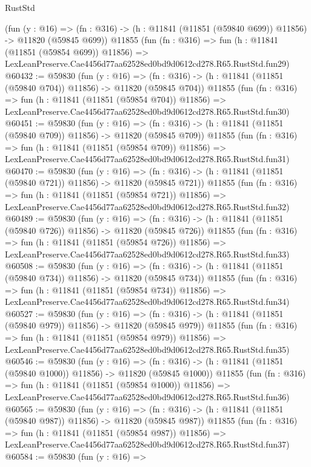 \begin{lexlean}{RustStd}
\begin{coremodule}
    (fun (y : @16) =>
    (fn : @316) -> (h : @11841 (@11851 (@59840 @699)) @11856) -> @11820 (@59845 @699))
    @11855
    (fun (fn : @316) =>
    fun (h : @11841 (@11851 (@59854 @699)) @11856) =>
    LexLeanPreserve.Cae4456d77aa62528ed0bd9d0612cd278.R65.RustStd.fun29)
@60432 := @59830
    (fun (y : @16) =>
    (fn : @316) -> (h : @11841 (@11851 (@59840 @704)) @11856) -> @11820 (@59845 @704))
    @11855
    (fun (fn : @316) =>
    fun (h : @11841 (@11851 (@59854 @704)) @11856) =>
    LexLeanPreserve.Cae4456d77aa62528ed0bd9d0612cd278.R65.RustStd.fun30)
@60451 := @59830
    (fun (y : @16) =>
    (fn : @316) -> (h : @11841 (@11851 (@59840 @709)) @11856) -> @11820 (@59845 @709))
    @11855
    (fun (fn : @316) =>
    fun (h : @11841 (@11851 (@59854 @709)) @11856) =>
    LexLeanPreserve.Cae4456d77aa62528ed0bd9d0612cd278.R65.RustStd.fun31)
@60470 := @59830
    (fun (y : @16) =>
    (fn : @316) -> (h : @11841 (@11851 (@59840 @721)) @11856) -> @11820 (@59845 @721))
    @11855
    (fun (fn : @316) =>
    fun (h : @11841 (@11851 (@59854 @721)) @11856) =>
    LexLeanPreserve.Cae4456d77aa62528ed0bd9d0612cd278.R65.RustStd.fun32)
@60489 := @59830
    (fun (y : @16) =>
    (fn : @316) -> (h : @11841 (@11851 (@59840 @726)) @11856) -> @11820 (@59845 @726))
    @11855
    (fun (fn : @316) =>
    fun (h : @11841 (@11851 (@59854 @726)) @11856) =>
    LexLeanPreserve.Cae4456d77aa62528ed0bd9d0612cd278.R65.RustStd.fun33)
@60508 := @59830
    (fun (y : @16) =>
    (fn : @316) -> (h : @11841 (@11851 (@59840 @734)) @11856) -> @11820 (@59845 @734))
    @11855
    (fun (fn : @316) =>
    fun (h : @11841 (@11851 (@59854 @734)) @11856) =>
    LexLeanPreserve.Cae4456d77aa62528ed0bd9d0612cd278.R65.RustStd.fun34)
@60527 := @59830
    (fun (y : @16) =>
    (fn : @316) -> (h : @11841 (@11851 (@59840 @979)) @11856) -> @11820 (@59845 @979))
    @11855
    (fun (fn : @316) =>
    fun (h : @11841 (@11851 (@59854 @979)) @11856) =>
    LexLeanPreserve.Cae4456d77aa62528ed0bd9d0612cd278.R65.RustStd.fun35)
@60546 := @59830
    (fun (y : @16) =>
    (fn : @316) -> (h : @11841 (@11851 (@59840 @1000)) @11856) -> @11820 (@59845 @1000))
    @11855
    (fun (fn : @316) =>
    fun (h : @11841 (@11851 (@59854 @1000)) @11856) =>
    LexLeanPreserve.Cae4456d77aa62528ed0bd9d0612cd278.R65.RustStd.fun36)
@60565 := @59830
    (fun (y : @16) =>
    (fn : @316) -> (h : @11841 (@11851 (@59840 @987)) @11856) -> @11820 (@59845 @987))
    @11855
    (fun (fn : @316) =>
    fun (h : @11841 (@11851 (@59854 @987)) @11856) =>
    LexLeanPreserve.Cae4456d77aa62528ed0bd9d0612cd278.R65.RustStd.fun37)
@60584 := @59830
    (fun (y : @16) =>

\end{coremodule}
\end{lexlean}

